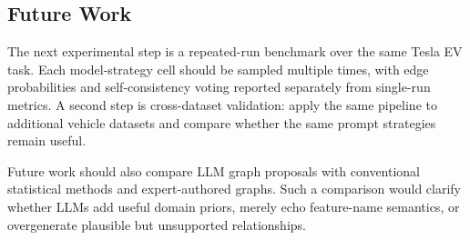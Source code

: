 \subsection{Future Work}

The next experimental step is a repeated-run benchmark over the same Tesla EV
task. Each model-strategy cell should be sampled multiple times, with edge
probabilities and self-consistency voting reported separately from single-run
metrics. A second step is cross-dataset validation: apply the same pipeline to
additional vehicle datasets and compare whether the same prompt strategies
remain useful.

Future work should also compare LLM graph proposals with conventional
statistical methods and expert-authored graphs. Such a comparison would
clarify whether LLMs add useful domain priors, merely echo feature-name
semantics, or overgenerate plausible but unsupported relationships.

